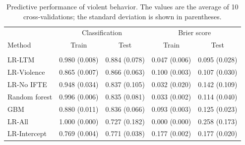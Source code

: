 \documentclass[a4paper,11pt]{article}
\begin{document}
\begin{table}[!ht]
    \caption{Predictive performance of violent behavior. The values are the average of 10 cross-validations; the standard deviation is shown in parentheses.}
    \label{tb:predictions}
    \centering
    \begin{tabular}{lrrrr}
        \toprule
        & \multicolumn{2}{c}{Classification} & \multicolumn{2}{c}{Brier score}\\
        \cmidrule(lr){2-3}  \cmidrule(lr){4-5}
        Method & \multicolumn{1}{c}{Train} & \multicolumn{1}{c}{Test} & \multicolumn{1}{c}{Train} & \multicolumn{1}{c}{Test} \\
        \midrule \\
        LR-LTM & 0.980 (0.008) & 0.884 (0.078) & 0.047 (0.006) & 0.095 (0.028) \\ 
        LR-Violence & 0.865 (0.007) & 0.866 (0.063) & 0.100 (0.003) & 0.107 (0.030) \\ 
        LR-No IFTE & 0.948 (0.034) & 0.837 (0.105) & 0.032 (0.020) & 0.142 (0.109) \\ 
        Random forest & 0.996 (0.006) & 0.835 (0.081) & 0.033 (0.002) & 0.114 (0.040) \\ 
        GBM & 0.880 (0.011) & 0.836 (0.066) & 0.093 (0.003) & 0.125 (0.023) \\ 
        LR-All & 1.000 (0.000) & 0.727 (0.182) & 0.000 (0.000) & 0.258 (0.173) \\ 
        LR-Intercept & 0.769 (0.004) & 0.771 (0.038) & 0.177 (0.002) & 0.177 (0.020) \\ 
        \bottomrule
    \end{tabular}
\end{table}
\end{document}
